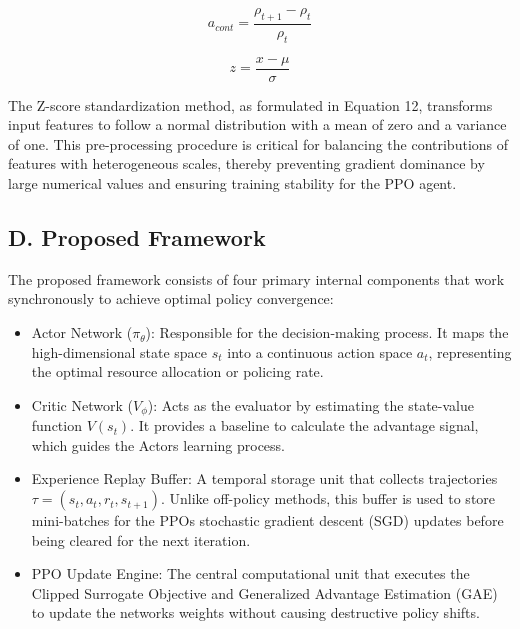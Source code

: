 \begin{equation}\label{eq:11}
a_{cont} = \frac{\rho_{t + 1} - \rho_{t}}{\rho_{t}}
\end{equation}

\begin{equation}\label{eq:12}
z = \frac{x - \mu}{\sigma}
\end{equation}

The Z-score standardization method, as formulated in Equation 12, transforms input features to follow a normal distribution with a mean of zero and a variance of one. This pre-processing procedure is critical for balancing the contributions of features with heterogeneous scales, thereby preventing gradient dominance by large numerical values and ensuring training stability for the PPO agent.

\subsection{D. Proposed Framework}\label{d.-proposed-framework}

The proposed framework consists of four primary internal components that work synchronously to achieve optimal policy convergence:

\begin{itemize}
\item
  Actor Network (\(\pi_{\theta}\)): Responsible for the decision-making process. It maps the high-dimensional state space \(s_{t}\) into a continuous action space \(a_{t}\), representing the optimal resource allocation or policing rate.
\item
  Critic Network (\(V_{\phi}\)): Acts as the evaluator by estimating the state-value function \(V\left( s_{t} \right)\). It provides a baseline to calculate the advantage signal, which guides the Actor\textquotesingle s learning process.
\item
  Experience Replay Buffer: A temporal storage unit that collects trajectories \(\tau = \left( s_{t},a_{t},r_{t},s_{t + 1} \right)\). Unlike off-policy methods, this buffer is used to store mini-batches for the PPO\textquotesingle s stochastic gradient descent (SGD) updates before being cleared for the next iteration.
\item
  PPO Update Engine: The central computational unit that executes the Clipped Surrogate Objective and Generalized Advantage Estimation (GAE) to update the networks\textquotesingle{} weights without causing destructive policy shifts.
\end{itemize}

